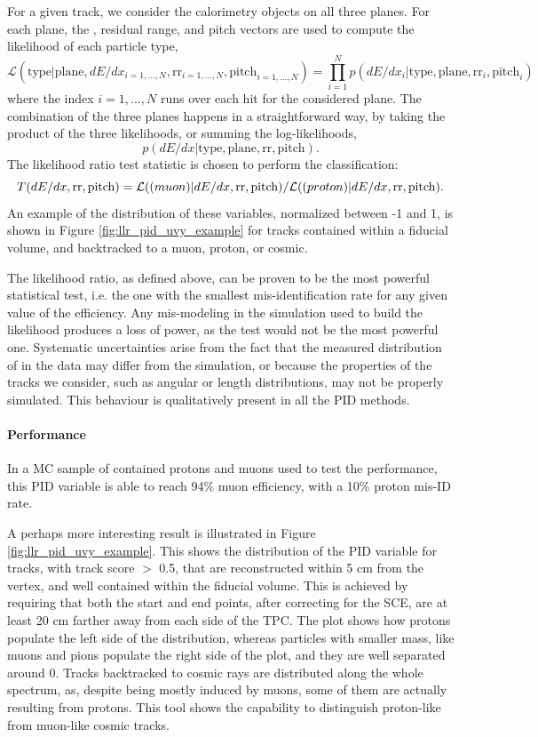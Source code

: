 For a given track, we consider the calorimetry objects on all three planes. 
For each plane, the \dedx, residual range, and pitch vectors are used to compute the likelihood of each particle type,
\[ \mathcal{L}(\text{type} | \text{plane}, dE/dx_{i = 1, ..., N},   \text{rr}_{i = 1, ..., N}, \text{pitch}_{i = 1, ..., N}) = \prod_{i=1}^N p(dE/dx_i | \text{type}, \text{plane}, \text{rr}_i, \text{pitch}_i) \]
where the index $i=1, ..., N$ runs over each hit for the considered plane.
The combination of the three planes happens in a straightforward way, by taking the product of the three likelihoods, or summing the log-likelihoods,
\[ p(dE/dx | \text{type}, \text{plane}, \text{rr}, \text{pitch}). \]
The likelihood ratio test statistic is chosen to perform the classification:
\[ T(dE/dx, \text{rr}, \text{pitch}) = \mathcal{L}(\text(muon)| dE/dx, \text{rr}, \text{pitch}) /  \mathcal{L}(\text(proton)| dE/dx, \text{rr}, \text{pitch}). \]
An example of the distribution of these variables, normalized between -1 and 1, is shown in Figure \ref{fig:llr_pid_uvy_example} for tracks contained within a fiducial volume, and backtracked to a muon, proton, or cosmic.

The likelihood ratio, as defined above, can be proven to be the most powerful statistical test, i.e. the one with the smallest mis-identification rate for any given value of the efficiency.
Any mis-modeling in the simulation used to build the likelihood produces a loss of power, as the test would not be the most powerful one.
Systematic uncertainties arise from the fact that the measured distribution of \dedx in the data may differ from the simulation, or because the properties of the tracks we consider, such as angular or length distributions, may not be properly simulated.
This behaviour is qualitatively present in all the PID methods.

\paragraph{Performance}
In a MC sample of contained protons and muons used to test the performance, this PID variable is able to reach 94\% muon efficiency, with a 10\% proton mis-ID rate.

A perhaps more interesting result is illustrated in Figure \ref{fig:llr_pid_uvy_example}.
This shows the distribution of the PID variable for tracks, with track score $>$ 0.5, that are reconstructed within 5 cm from the vertex, and well contained within the fiducial volume.
This is achieved by requiring that both the start and end points, after correcting for the SCE, are at least 20 cm farther away from each side of the TPC.
The plot shows how protons populate the left side of the distribution, whereas particles with smaller mass, like muons and pions populate the right side of the plot, and they are well separated around 0.
Tracks backtracked to cosmic rays are distributed along the whole spectrum, as, despite being mostly induced by muons, some of them are actually resulting from protons.
This tool shows the capability to distinguish proton-like from muon-like cosmic tracks.

